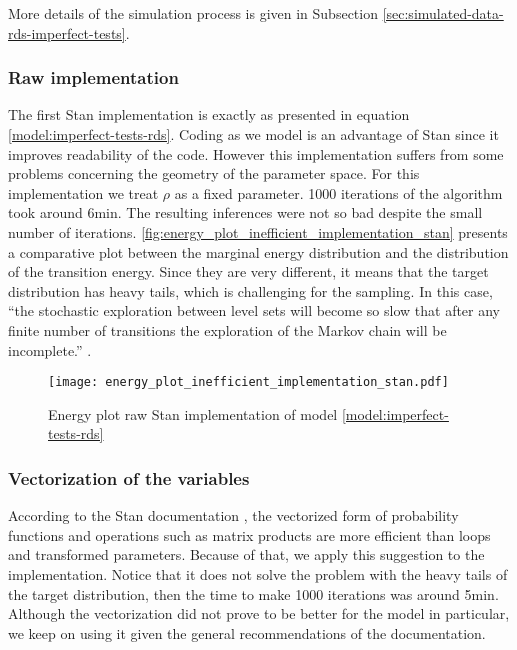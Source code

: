 More details of the simulation process is given in Subsection
\ref{sec:simulated-data-rds-imperfect-tests}. 

\subsubsection*{Raw implementation}

The first Stan implementation is exactly as presented in equation
\eqref{model:imperfect-tests-rds}. Coding as we model is an advantage of Stan 
since it improves readability of the code. However this implementation suffers from
some problems concerning the geometry of the parameter space. For this
implementation we treat $\rho$ as a fixed parameter. 1000 iterations of the
algorithm took around 6min. The resulting inferences were not so bad despite
the small number of iterations.
\autoref{fig:energy_plot_inefficient_implementation_stan} presents a
comparative plot between the marginal energy distribution and the distribution
of the transition energy. Since they are very different, it means that the
target distribution has heavy tails, which is challenging for the sampling. In
this case, ``the stochastic exploration between level sets will become so slow that after any finite
number of transitions the exploration of the Markov chain will be
incomplete.'' \cite[p. 44]{betancourt2017conceptual}.

\begin{figure}
  \centering
  \caption{\label{fig:energy_plot_inefficient_implementation_stan}Energy plot
  raw Stan implementation of model \eqref{model:imperfect-tests-rds}}
  \texttt{[image: energy\_plot\_inefficient\_implementation\_stan.pdf]}
\end{figure}

\subsubsection*{Vectorization of the variables}

According to the Stan documentation \cite{stan2021vectorization}, the
vectorized form of probability functions and operations such as matrix
products are more efficient than loops and transformed parameters. Because of
that, we apply this suggestion to the implementation. Notice that it does not
solve the problem with the heavy tails of the target distribution, then the
time to make 1000 iterations was around 5min. Although the vectorization did
not prove to be better for the model in particular, we keep on using it given
the general recommendations of the documentation. 

